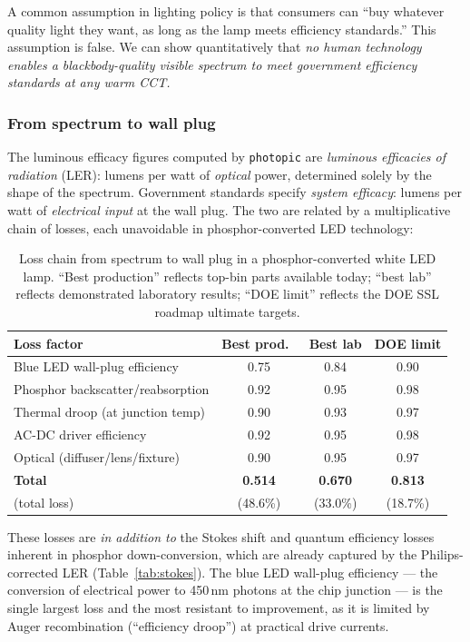 \documentclass[11pt]{article}
\begin{document}
A common assumption in lighting policy is that consumers can
``buy whatever quality light they want, as long as the lamp meets
efficiency standards.''  This assumption is false.  We can show
quantitatively that \emph{no human technology enables a
blackbody-quality visible spectrum to meet government efficiency
standards at any warm CCT.}

\subsubsection{From spectrum to wall plug}

The luminous efficacy figures computed by \texttt{photopic} are
\emph{luminous efficacies of radiation} (LER): lumens per watt of
\emph{optical} power, determined solely by the shape of the spectrum.
Government standards specify \emph{system efficacy}: lumens per watt
of \emph{electrical input} at the wall plug.  The two are related by
a multiplicative chain of losses, each unavoidable in phosphor-converted
LED technology:

\begin{table}[H]
\centering
\caption{Loss chain from spectrum to wall plug in a phosphor-converted
  white LED lamp.  ``Best production'' reflects top-bin parts available
  today; ``best lab'' reflects demonstrated laboratory results; ``DOE
  limit'' reflects the DOE SSL roadmap ultimate targets.}
\label{tab:losses}
\begin{tabular}{lccc}
\toprule
Loss factor & Best prod.\ & Best lab & DOE limit \\
\midrule
Blue LED wall-plug efficiency  & 0.75 & 0.84 & 0.90 \\
Phosphor backscatter/reabsorption & 0.92 & 0.95 & 0.98 \\
Thermal droop (at junction temp)  & 0.90 & 0.93 & 0.97 \\
AC-DC driver efficiency           & 0.92 & 0.95 & 0.98 \\
Optical (diffuser/lens/fixture)   & 0.90 & 0.95 & 0.97 \\
\midrule
\textbf{Total}                & \textbf{0.514} & \textbf{0.670} & \textbf{0.813} \\
\quad (total loss)            & (48.6\%) & (33.0\%) & (18.7\%) \\
\bottomrule
\end{tabular}
\end{table}

\noindent
These losses are \emph{in addition to} the Stokes shift and quantum
efficiency losses inherent in phosphor down-conversion, which are already
captured by the Philips-corrected LER (Table~\ref{tab:stokes}).
The blue LED wall-plug efficiency --- the conversion of electrical power
to 450\,nm photons at the chip junction --- is the single largest loss
and the most resistant to improvement, as it is limited by Auger
recombination (``efficiency droop'') at practical drive currents.
\end{document}
